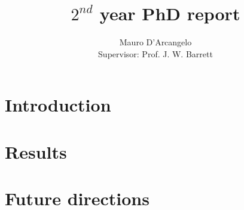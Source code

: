 \documentclass[12pt,a4paper]{article}
\title{$2^{nd}$ year PhD report}
\author{Mauro D'Arcangelo \\ Supervisor: Prof. J. W. Barrett}
\date{}
\begin{document}
\maketitle


\tableofcontents
\newpage

\section{Introduction}\label{intro}

\newpage

\section{Results}\label{results}

\newpage

\newpage

\newpage

\section{Future directions}\label{future}

\newpage


\newpage
\end{document}
